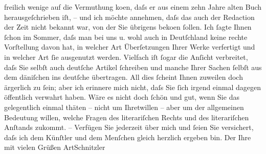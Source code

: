 \begin{ledgroupsized}[t]{13cm}
                    freilich wenige auf die Vermuthung ko{\geminationm}en, daſs er
                    aus einem {\pb}zehn Jahre alten Buch
                    herausgeſchrieben iſt, – und ich möchte annehmen, daſs das auch der Redaction
                    der Zeit nicht bekannt war, von der Sie
                    übrigens \label{K_L00602_1v}\label{K_L00602_1h} beko{\geminationm}en ſollen. Ich ſagte Ihnen ſchon im Sommer, daſs
                    man bei uns u. wohl auch in Deutſchland keine
                    rechte Vorſtellung davon hat, in welcher Art Überſetzungen Ihrer Werke
                    verfertigt und in welcher Art ſie ausgenutzt werden. Vielfach iſt ſogar die
                    Anſicht verbreitet, daſs Sie selbſt auch deutſche Artikel ſchreiben und manche
                    Ihrer Sachen ſelbſt aus dem däniſchen ins
                    deutſche übertragen.\pend
           \pstart
           {\pb}All dies ſcheint Ihnen zuweilen doch
                    ärgerlich zu ſein; aber ich erinnere mich nicht, daſs Sie ſich irgend einmal
                    dagegen öffentlich verwahrt haben.\pend
           \pstart
           Wäre es nicht doch ſchön und gut, wenn Sie das gelegentlich einmal thäten – nicht
                    um Ihretwillen – aber um der allgemeinen Bedeutung willen, welche Fragen des
                    literariſchen Rechts und des literariſchen Anſtands zukommt. –\pend
           \pstart
           Verfügen Sie jederzeit über mich und ſeien Sie versichert, daſs ich dem Künſtler
                    und dem Menſchen gleich herzlich ergeben bin.\pend
           \pstart Der Ihre mit vielen Grüßen \spacefill\mbox{ArtSchnitzler}\pend{}
         
         \endnumbering{}\end{ledgroupsized}  \newcommand{\dateiname}{L00602}\newcommand{\titel}{Arthur Schnitzler an Georg Brandes, 8. 10. 1896}\newcommand{\editorInnen}{Martin Anton Müller und Gerd-Hermann Susen}
      
